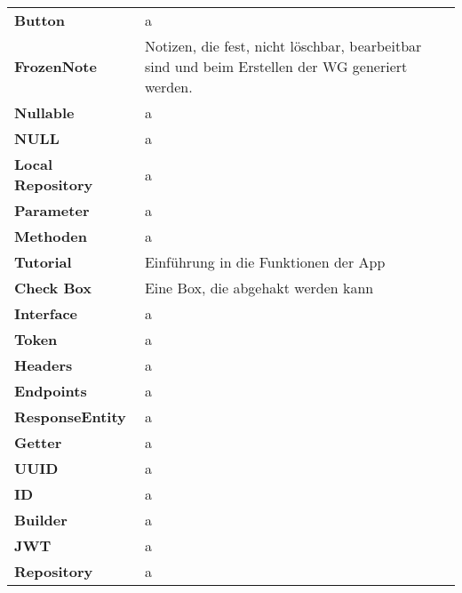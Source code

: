 \begin{table}[h!]
\begin{tabular}{p{4cm}p{10cm}}
				\textbf{Button} & a\\
				\textbf{FrozenNote} & Notizen, die fest, nicht löschbar, bearbeitbar sind und beim Erstellen der WG generiert werden.   \\
				\textbf{Nullable} & a  \\
				\textbf{NULL} & a  \\
				\textbf{Local Repository} & a  \\
				\textbf{Parameter} & a  \\
				\textbf{Methoden} & a  \\
				\textbf{Tutorial} &  Einführung in die Funktionen der App
   \\
				\textbf{Check Box} &  Eine Box, die abgehakt werden kann \\
				\textbf{Interface} & a  \\
				\textbf{Token} & a  \\
				\textbf{Headers} & a  \\
				\textbf{Endpoints} & a  \\
				\textbf{ResponseEntity} & a  \\	
				\textbf{Getter} & a  \\	
				\textbf{UUID} &a   \\	
				\textbf{ID} &  a \\	
				\textbf{Builder} &  a \\	
				\textbf{JWT} &  a \\	
				\textbf{Repository} &  a \\	
				
			\end{tabular}
		\end{table}